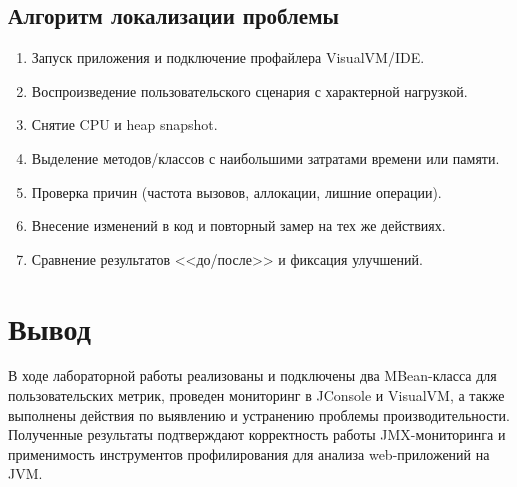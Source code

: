 \documentclass[12pt,a4paper]{article}
\begin{document}
\subsection{Алгоритм локализации проблемы}
\begin{enumerate}
    \item Запуск приложения и подключение профайлера VisualVM/IDE.
    \item Воспроизведение пользовательского сценария с характерной нагрузкой.
    \item Снятие CPU и heap snapshot.
    \item Выделение методов/классов с наибольшими затратами времени или памяти.
    \item Проверка причин (частота вызовов, аллокации, лишние операции).
    \item Внесение изменений в код и повторный замер на тех же действиях.
    \item Сравнение результатов <<до/после>> и фиксация улучшений.
\end{enumerate}

\section{Вывод}
В ходе лабораторной работы реализованы и подключены два MBean-класса для пользовательских метрик,
проведен мониторинг в JConsole и VisualVM, а также выполнены действия по выявлению и устранению
проблемы производительности. Полученные результаты подтверждают корректность работы JMX-мониторинга
и применимость инструментов профилирования для анализа web-приложений на JVM.
\end{document}
